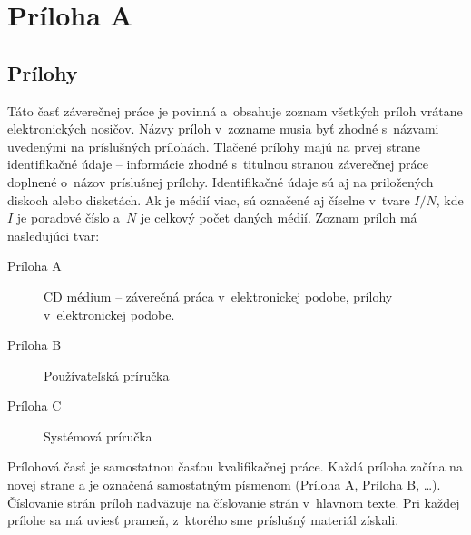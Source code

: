 \section*{Príloha A}
\subsection*{Prílohy}

Táto časť záverečnej práce je povinná a~obsahuje zoznam všetkých
príloh vrátane elektronických nosičov. Názvy príloh v~zozname musia
byť zhodné s~názvami uvedenými na príslušných prílohách. Tlačené
prílohy majú na prvej strane identifikačné údaje -- informácie zhodné
s~titulnou stranou záverečnej práce doplnené o~názov príslušnej
prílohy. Identifikačné údaje sú aj na priložených diskoch alebo
disketách. Ak je médií viac, sú označené aj číselne v~tvare $I/N$, kde
$I$ je poradové číslo a~$N$ je celkový počet daných médií. Zoznam
príloh má nasledujúci tvar:
\begin{description}
\item[Príloha A] CD médium -- záverečná práca v~elektronickej podobe,
prílohy v~elektronickej podobe.
\item[Príloha B] Používateľská príručka
\item[Príloha C] Systémová príručka
\end{description}
Prílohová časť je samostatnou časťou kvalifikačnej práce. Každá
príloha začína na novej strane a je označená samostatným písmenom
(Príloha A, Príloha B, \dots). Číslovanie strán príloh nadväzuje na
číslovanie strán v~hlavnom texte. Pri každej prílohe sa má uviesť
prameň, z~ktorého sme príslušný materiál získali.
